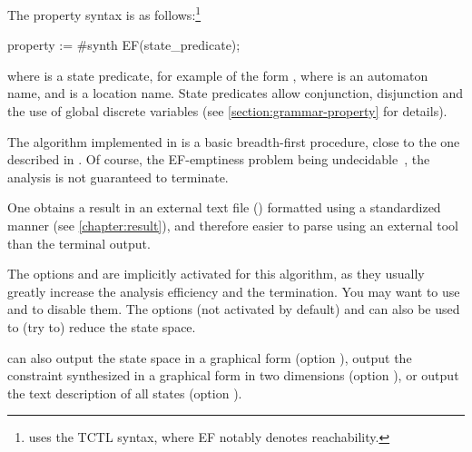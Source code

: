 The property syntax is as follows:\footnote{%
	\imitator{} uses the TCTL syntax, where EF notably denotes reachability.
}

\begin{IMITATORproperty}
property := #synth EF(state_predicate);
\end{IMITATORproperty}


\noindent{}where  is a state predicate, for example of the form , where  is an automaton name, and  is a location name.
State predicates allow conjunction, disjunction and the use of global discrete variables (see \cref{section:grammar-property} for details).



The algorithm \EFsynth{} implemented in \imitator{} is a basic breadth-first procedure, close to the one described in \cite{JLR15}.
Of course, the EF-emptiness problem being undecidable~\cite{AHV93}, the analysis is not guaranteed to terminate.

One obtains a result in an external text file () formatted using a standardized manner (see \cref{chapter:result}), and therefore easier to parse using an external tool than the terminal output.

The options  \cite{AFS13atva} and  are implicitly activated for this algorithm, as they usually greatly increase the analysis efficiency and the termination.
You may want to use  and  to disable them.
The options  (not activated by default) and  can also be used to (try to) reduce the state space.

\imitator{} can also
output the state space in a graphical form (option ),
output the constraint synthesized in a graphical form in two dimensions (option ),
or
output the text description of all states (option ).


